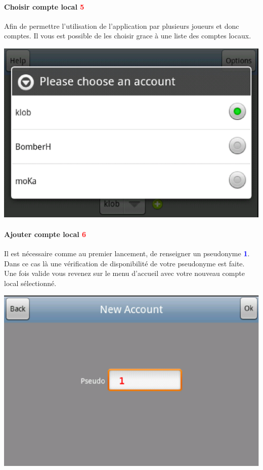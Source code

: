 			
\paragraph{Choisir compte local \textcolor{red}{5}\\}
	Afin de permettre l'utilisation de l'application par plusieurs joueurs et donc
	comptes. Il vous est possible de les choisir grace à une liste des comptes
	locaux. 
	\begin{center}
		\includegraphics[scale=0.6]{Manuel/Img/8.eps}
	\end{center}
	
\newpage{}	

\paragraph{Ajouter compte local \textcolor{red}{6}\\}
	Il est nécessaire comme au premier lancement, de renseigner un pseudonyme 
	\textcolor{blue}{\textbf{1}}. Dans ce cas là une vérification de disponibilité
	de votre pseudonyme est faite. Une fois valide vous
	revenez sur le menu d'accueil avec votre nouveau compte local sélectionné.
	\begin{center}
		\includegraphics[scale=0.6]{Manuel/Img/9.eps}
	\end{center}
	
	